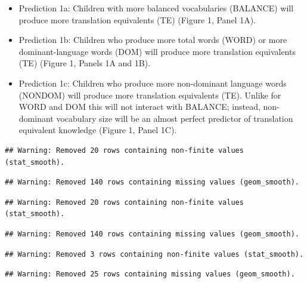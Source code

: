 \documentclass[
  english,
  ,man,floatsintext]{apa6}
\providecommand{\tightlist}{%
  \setlength{\itemsep}{0pt}\setlength{\parskip}{0pt}}
\begin{document}
\begin{itemize}
\tightlist
\item
  Prediction 1a: Children with more balanced vocabularies (BALANCE) will produce more translation equivalents (TE) (Figure 1, Panel 1A).
\item
  Prediction 1b: Children who produce more total words (WORD) or more dominant-language words (DOM) will produce more translation equivalents (TE) (Figure 1, Panels 1A and 1B).
\item
  Prediction 1c: Children who produce more non-dominant language words (NONDOM) will produce more translation equivalents (TE). Unlike for WORD and DOM this will not interact with BALANCE; instead, non-dominant vocabulary size will be an almost perfect predictor of translation equivalent knowledge (Figure 1, Panel 1C).
\end{itemize}

\begin{verbatim}
## Warning: Removed 20 rows containing non-finite values (stat_smooth).
\end{verbatim}

\begin{verbatim}
## Warning: Removed 140 rows containing missing values (geom_smooth).
\end{verbatim}

\begin{verbatim}
## Warning: Removed 20 rows containing non-finite values (stat_smooth).
\end{verbatim}

\begin{verbatim}
## Warning: Removed 140 rows containing missing values (geom_smooth).
\end{verbatim}

\begin{verbatim}
## Warning: Removed 3 rows containing non-finite values (stat_smooth).
\end{verbatim}

\begin{verbatim}
## Warning: Removed 25 rows containing missing values (geom_smooth).
\end{verbatim}
\end{document}
